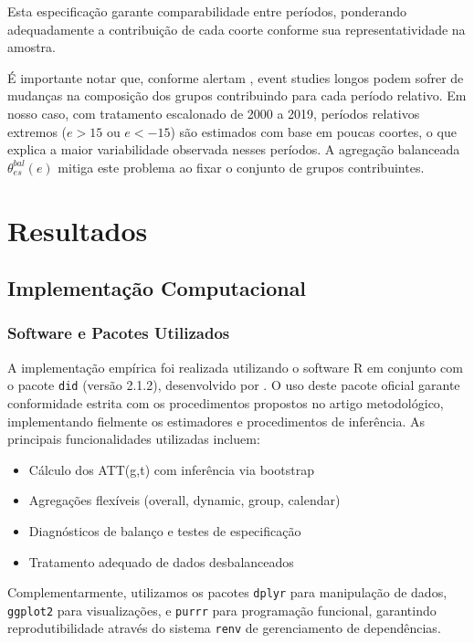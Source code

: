 \documentclass[
	12pt,				%
	oneside,			%
	a4paper,			%
	english,			%
	french,				%
	spanish,			%
	brazil				%
	]{abntex2}
\begin{document}
Esta especificação garante comparabilidade entre períodos, ponderando adequadamente a contribuição de cada coorte conforme sua representatividade na amostra.

É importante notar que, conforme alertam , event studies longos podem sofrer de mudanças na composição dos grupos contribuindo para cada período relativo. Em nosso caso, com tratamento escalonado de 2000 a 2019, períodos relativos extremos ($e > 15$ ou $e < -15$) são estimados com base em poucas coortes, o que explica a maior variabilidade observada nesses períodos. A agregação balanceada $\theta_{es}^{bal}(e)$ mitiga este problema ao fixar o conjunto de grupos contribuintes.

\chapter{Resultados}

\section{Implementação Computacional}

\subsection{Software e Pacotes Utilizados}

A implementação empírica foi realizada utilizando o software R \cite{rcoreteam2024} em conjunto com o pacote \texttt{did} (versão 2.1.2), desenvolvido por . O uso deste pacote oficial garante conformidade estrita com os procedimentos propostos no artigo metodológico, implementando fielmente os estimadores e procedimentos de inferência. As principais funcionalidades utilizadas incluem:

\begin{itemize}
\item Cálculo dos ATT(g,t) com inferência via bootstrap
\item Agregações flexíveis (overall, dynamic, group, calendar)
\item Diagnósticos de balanço e testes de especificação
\item Tratamento adequado de dados desbalanceados
\end{itemize}

Complementarmente, utilizamos os pacotes \texttt{dplyr} para manipulação de dados, \texttt{ggplot2} para visualizações, e \texttt{purrr} para programação funcional, garantindo reprodutibilidade através do sistema \texttt{renv} de gerenciamento de dependências.
\end{document}
